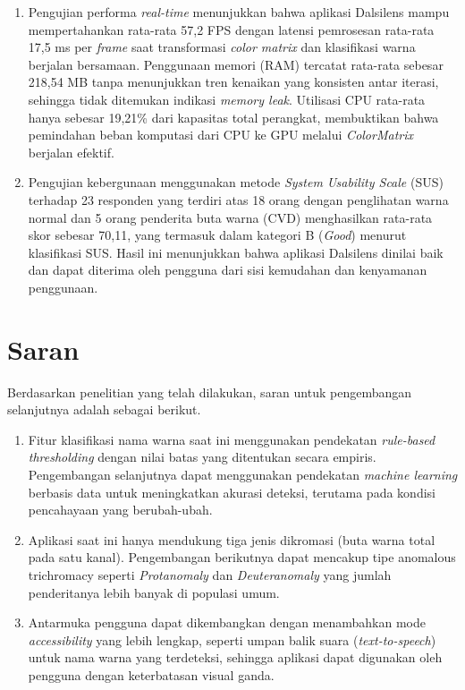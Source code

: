 \begin{enumerate}
  \item Pengujian performa \textit{real-time} menunjukkan bahwa aplikasi Dalsilens
        mampu mempertahankan rata-rata 57,2 FPS dengan latensi pemrosesan rata-rata
        17,5 ms per \textit{frame} saat transformasi \textit{color matrix} dan
        klasifikasi warna berjalan bersamaan.
        Penggunaan memori (RAM) tercatat rata-rata sebesar 218,54 MB tanpa
        menunjukkan tren kenaikan yang konsisten antar iterasi, sehingga tidak
        ditemukan indikasi \textit{memory leak}.
        Utilisasi CPU rata-rata hanya sebesar 19,21\% dari kapasitas total
        perangkat, membuktikan bahwa pemindahan beban komputasi dari CPU ke GPU
        melalui \textit{ColorMatrix} berjalan efektif.

  \item Pengujian kebergunaan menggunakan metode \textit{System Usability Scale}
        (SUS) terhadap 23 responden yang terdiri atas 18 orang dengan penglihatan
        warna normal dan 5 orang penderita buta warna (CVD) menghasilkan rata-rata
        skor sebesar 70,11, yang termasuk dalam kategori B (\textit{Good}) menurut
        klasifikasi SUS.
        Hasil ini menunjukkan bahwa aplikasi Dalsilens dinilai baik dan dapat
        diterima oleh pengguna dari sisi kemudahan dan kenyamanan penggunaan.
\end{enumerate}

\section{Saran}

Berdasarkan penelitian yang telah dilakukan, saran untuk pengembangan selanjutnya
adalah sebagai berikut.
\begin{enumerate}
  \item Fitur klasifikasi nama warna saat ini menggunakan pendekatan
        \textit{rule-based thresholding} dengan nilai batas yang ditentukan secara
        empiris.
        Pengembangan selanjutnya dapat menggunakan pendekatan \textit{machine
        learning} berbasis data untuk meningkatkan akurasi deteksi, terutama pada
        kondisi pencahayaan yang berubah-ubah.

  \item Aplikasi saat ini hanya mendukung tiga jenis dikromasi (buta warna total
        pada satu kanal).
        Pengembangan berikutnya dapat mencakup tipe anomalous trichromacy seperti
        \textit{Protanomaly} dan \textit{Deuteranomaly} yang jumlah penderitanya
        lebih banyak di populasi umum.

  \item Antarmuka pengguna dapat dikembangkan dengan menambahkan mode
        \textit{accessibility} yang lebih lengkap, seperti umpan balik suara
        (\textit{text-to-speech}) untuk nama warna yang terdeteksi, sehingga
        aplikasi dapat digunakan oleh pengguna dengan keterbatasan visual ganda.
\end{enumerate}
